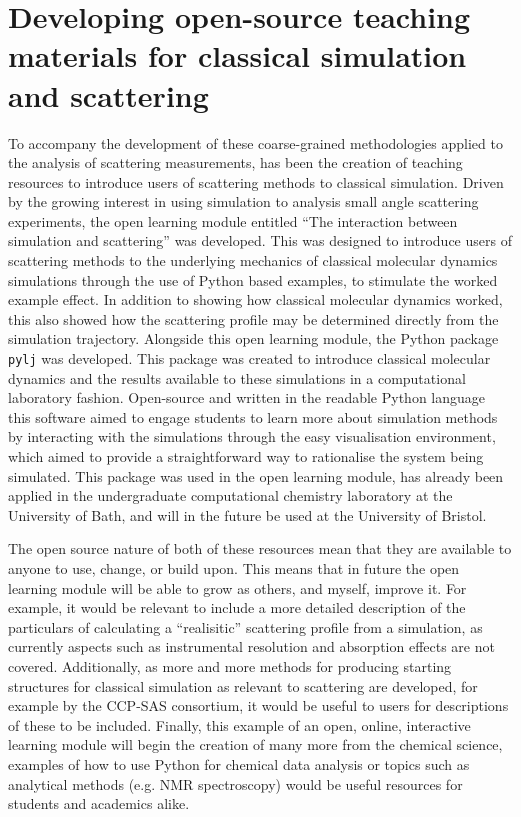 \section{Developing open-source teaching materials for classical simulation and scattering}
To accompany the development of these coarse-grained methodologies applied to the analysis of scattering measurements, has been the creation of teaching resources to introduce users of scattering methods to classical simulation.
Driven by the growing interest in using simulation to analysis small angle scattering experiments,\autocite{hub_interpreting_2018,perkins_atomistic_2016} the open learning module entitled ``The interaction between simulation and scattering'' was developed.\autocite{mccluskey_introduction_2019,mccluskey_pythoninchemistry/sim_and_scat_2019}
This was designed to introduce users of scattering methods to the underlying mechanics of classical molecular dynamics simulations through the use of Python based examples, to stimulate the worked example effect.
In addition to showing how classical molecular dynamics worked, this also showed how the scattering profile may be determined directly from the simulation trajectory.
Alongside this open learning module, the Python package \texttt{pylj} was developed.\autocite{mccluskey_pylj_2018,mccluskey_arm61/pylj_2019-2}
This package was created to introduce classical molecular dynamics and the results available to these simulations in a computational laboratory fashion.
Open-source and written in the readable Python language this software aimed to engage students to learn more about simulation methods by interacting with the simulations through the easy visualisation environment, which aimed to provide a straightforward way to rationalise the system being simulated.
This package was used in the open learning module, has already been applied in the undergraduate computational chemistry laboratory at the University of Bath, and will in the future be used at the University of Bristol.

The open source nature of both of these resources mean that they are available to anyone to use, change, or build upon.
This means that in future the open learning module will be able to grow as others, and myself, improve it.
For example, it would be relevant to include a more detailed description of the particulars of calculating a ``realisitic'' scattering profile from a simulation, as currently aspects such as instrumental resolution and absorption effects are not covered.
Additionally, as more and more methods for producing starting structures for classical simulation as relevant to scattering are developed, for example by the CCP-SAS consortium, it would be useful to users for descriptions of these to be included.
Finally, this example of an open, online, interactive learning module will begin the creation of many more from the chemical science, examples of how to use Python for chemical data analysis or topics such as analytical methods (e.g. NMR spectroscopy) would be useful resources for students and academics alike.

